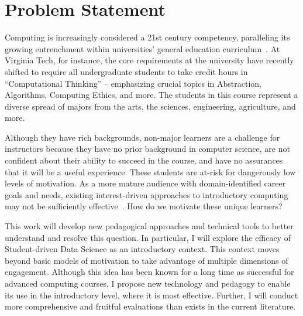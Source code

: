 \section{Problem Statement}

Computing is increasingly considered a 21st century competency, paralleling its growing entrenchment within universities’ general education curriculum~\cite{wing2006}.
At Virginia Tech, for instance, the core requirements at the university have recently shifted to require all undergraduate students to take credit hours in ``Computational Thinking'' -- emphasizing crucial topics in Abstraction, Algorithms, Computing Ethics, and more.
The students in this course represent a diverse spread of majors from the arts, the sciences, engineering, agriculture, and more.

Although they have rich backgrounds, non-major learners are a challenge for instructors because they have no prior background in computer science, are not confident about their ability to succeed in the course, and have no assurances that it will be a useful experience.
These students are at-risk for dangerously low levels of motivation.
As a more mature audience with domain-identified career goals and needs, existing interest-driven approaches to introductory computing may not be sufficiently effective~\cite{guzdial2006imagineering}.
How do we motivate these unique learners?

This work will develop new pedagogical approaches and technical tools to better understand and resolve this question.
In particular, I will explore the efficacy of Student-driven Data Science as an introductory context.
This context moves beyond basic models of motivation to take advantage of multiple dimensions of engagement.
Although this idea has been known for a long time as successful for advanced computing courses, I propose new technology and pedagogy to enable its use in the introductory level, where it is most effective.
Further, I will conduct more comprehensive and fruitful evaluations than exists in the current literature.

